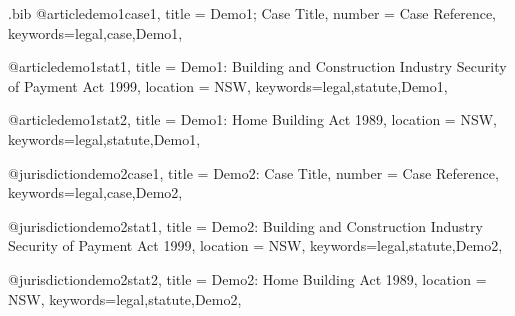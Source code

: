 

\begin{filecontents*}{\jobname.bib}
@article{demo1case1,
title = {Demo1; Case Title},
number = {Case Reference},
keywords={legal,case,Demo1},
}

@article{demo1stat1,
title = {Demo1: Building and Construction Industry Security of Payment Act 1999},
location = {NSW},
keywords={legal,statute,Demo1},
}

@article{demo1stat2,
title = {Demo1: Home Building Act 1989},
location = {NSW},
keywords={legal,statute,Demo1},
}



@jurisdiction{demo2case1,
title = {Demo2: Case Title},
number = {Case Reference},
keywords={legal,case,Demo2},
}

@jurisdiction{demo2stat1,
title = {Demo2: Building and Construction Industry Security of Payment Act 1999},
location = {NSW},
keywords={legal,statute,Demo2},
}

@jurisdiction{demo2stat2,
title = {Demo2: Home Building Act 1989},
location = {NSW},
keywords={legal,statute,Demo2},
}


\end{filecontents*}



\documentclass[12pt,varwidth,border=6pt]{standalone}
\newcommand\rulesep{\rule{0.4\textwidth}{.4pt}}
\usepackage[table]{xcolor}
\pagecolor{blue!3}
\usepackage{fontspec}
\setmainfont{Noto Serif}
\setmonofont{Noto Sans Mono}[Colour=blue]

\newfontface{}
\newcommand\goodoh{{\large\ftmark 🗸}}
\newcommand\notsogoodoh{{\large\ftmark 🗶}}




\newcommand\abibname{lawcite}
\newcommand\abibstyle{style=\abibname}
\usepackage[
	\abibstyle , 
	indexing=cite,
	citetracker=true,
	ibidtracker=true,
	pagetracker=true,
	idemtracker=true,
	opcittracker=true,
	loccittracker=true,
	autocite=footnote,
		]{biblatex}




				
			
\newcommand\setmpx{\color{red}}
\AtEveryBibitem{%
\ifkeyword{Demo1}{\setmpx\notsogoodoh}{}\ifkeyword{Demo2}{\textcolor{blue}{\goodoh}}{}%
}				
			
